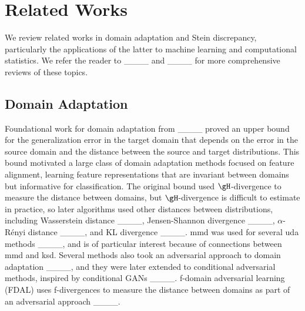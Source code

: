\section{Related Works}
\label{sec:related-work}

We review related works in domain adaptation and Stein discrepancy, particularly the applications of the latter to machine learning and computational statistics. We refer the reader to ____ and ____ for more comprehensive reviews of these topics.

\subsection{Domain Adaptation}

Foundational work for domain adaptation from ____ proved an upper bound for the generalization error in the target domain that depends on the error in the source domain and the distance between the source and target distributions.
This bound motivated a large class of domain adaptation methods focused on feature alignment, learning feature representations that are invariant between domains but informative for classification.
The original bound used $\gH$-divergence to measure the distance between domains, but
$\gH$-divergence is difficult to estimate in practice, so later algorithms used other distances between distributions, including Wasserstein distance ____, Jensen-Shannon divergence ____, $\alpha$-R\'enyi distance ____, and KL divergence ____.
\Ac{mmd} was used for several \ac{uda} methods ____, and is of particular interest because of connections between \ac{mmd} and \ac{ksd}.
Several methods also took an adversarial approach to domain adaptation ____,
and they were later extended to conditional adversarial methods, inspired by conditional GANs ____.
f-domain adversarial learning (FDAL) uses f-divergences to measure the distance between domains as part of an adversarial approach ____.
